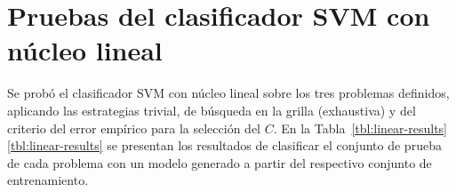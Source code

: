 %
%
%
\section{Pruebas del clasificador SVM con núcleo lineal}
%
Se probó el clasificador SVM con núcleo lineal sobre los tres
problemas definidos, aplicando las estrategias trivial, de búsqueda en
la grilla (exhaustiva) y del criterio del error empírico para la
selección del  $C$.
En la \iflatexml{}Tabla~\ref{tbl:linear-results}\else\autoref{tbl:linear-results}\fi{}
se presentan los resultados de clasificar el conjunto de prueba de
cada problema con un modelo generado a partir del respectivo
conjunto de entrenamiento.
